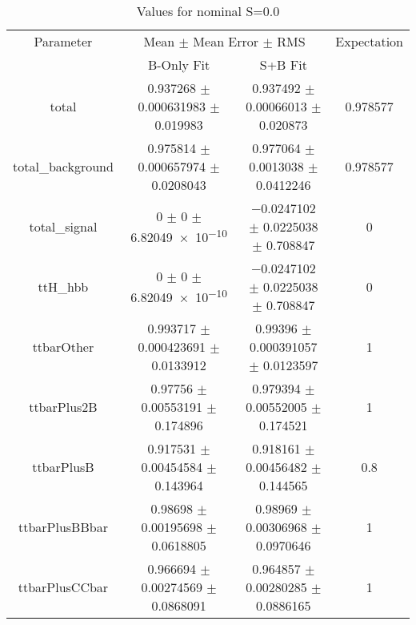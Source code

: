 \begin{table}
\centering
\caption{Values for nominal S=0.0}
\begin{tabular}{cccc}
\toprule
Parameter & \multicolumn{2}{c}{Mean $\pm$ Mean Error $\pm$ RMS} & Expectation\\
 & B-Only Fit & S+B Fit & \\
\midrule
total & \num{0.937268} $\pm$ \num{0.000631983} $\pm$ \num{0.019983} & \num{0.937492} $\pm$ \num{0.00066013} $\pm$ \num{0.020873} & \num{0.978577}\\
total\_background & \num{0.975814} $\pm$ \num{0.000657974} $\pm$ \num{0.0208043} & \num{0.977064} $\pm$ \num{0.0013038} $\pm$ \num{0.0412246} & \num{0.978577}\\
total\_signal & \num{0} $\pm$ \num{0} $\pm$ \num{6.82049e-10} & \num{-0.0247102} $\pm$ \num{0.0225038} $\pm$ \num{0.708847} & \num{0}\\
ttH\_hbb & \num{0} $\pm$ \num{0} $\pm$ \num{6.82049e-10} & \num{-0.0247102} $\pm$ \num{0.0225038} $\pm$ \num{0.708847} & \num{0}\\
ttbarOther & \num{0.993717} $\pm$ \num{0.000423691} $\pm$ \num{0.0133912} & \num{0.99396} $\pm$ \num{0.000391057} $\pm$ \num{0.0123597} & \num{1}\\
ttbarPlus2B & \num{0.97756} $\pm$ \num{0.00553191} $\pm$ \num{0.174896} & \num{0.979394} $\pm$ \num{0.00552005} $\pm$ \num{0.174521} & \num{1}\\
ttbarPlusB & \num{0.917531} $\pm$ \num{0.00454584} $\pm$ \num{0.143964} & \num{0.918161} $\pm$ \num{0.00456482} $\pm$ \num{0.144565} & \num{0.8}\\
ttbarPlusBBbar & \num{0.98698} $\pm$ \num{0.00195698} $\pm$ \num{0.0618805} & \num{0.98969} $\pm$ \num{0.00306968} $\pm$ \num{0.0970646} & \num{1}\\
ttbarPlusCCbar & \num{0.966694} $\pm$ \num{0.00274569} $\pm$ \num{0.0868091} & \num{0.964857} $\pm$ \num{0.00280285} $\pm$ \num{0.0886165} & \num{1}\\
\bottomrule
\end{tabular}
\end{table}
